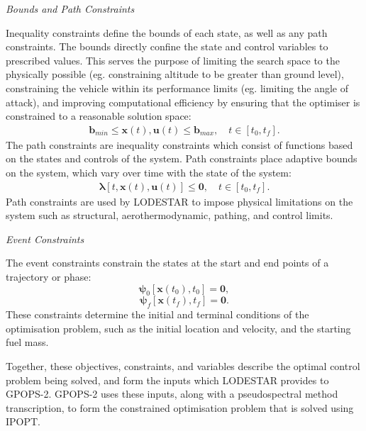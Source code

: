 \noindent \textit{Bounds and Path Constraints}

\noindent Inequality constraints define the bounds of each state, as well as any path constraints.
The bounds directly confine the state and control variables to prescribed values. This serves the purpose of limiting the search space to the physically possible (eg. constraining altitude to be greater than ground level), constraining the vehicle within its performance limits (eg. limiting the angle of attack), and improving computational efficiency by ensuring that the optimiser is constrained to a reasonable solution space:
\begin{eqnarray}
\mathbf{b}_{min} \leq \textbf{x}(t),\textbf{u}(t) \leq \mathbf{b}_{max}, \quad t \in [t_0,t_f].
\end{eqnarray}
The path constraints are inequality constraints which consist of functions based on the states and controls of the system. Path constraints place adaptive bounds on the system, which vary over time with the state of the system:
\begin{eqnarray}
\mathbf{\lambda}[t,\textbf{x}(t),\textbf{u}(t)] \leq \textbf{0}, \quad t \in [t_0,t_f].
\end{eqnarray}
Path constraints are used by LODESTAR to impose physical limitations on the system such as structural, aerothermodynamic, pathing, and control limits.

\noindent \textit{Event Constraints}

\noindent The event constraints constrain the states at the start and end points of a trajectory or phase:
\begin{equation}
\mathbf{\psi}_0[\textbf{x}(t_{0}), t_{0}] = \textbf{0},
\end{equation}
\begin{equation} \label{eq:2}
\mathbf{\psi}_f[\textbf{x}(t_{f}), t_{f}] = \textbf{0}.
\end{equation}
These constraints determine the initial and terminal conditions of the optimisation problem, such as the initial location and velocity, and the starting fuel mass.


Together, these objectives, constraints, and variables describe the optimal control problem being solved, and form the inputs which LODESTAR provides to GPOPS-2. GPOPS-2 uses these inputs, along with a pseudospectral method transcription, to form the constrained optimisation problem that is solved using IPOPT.









